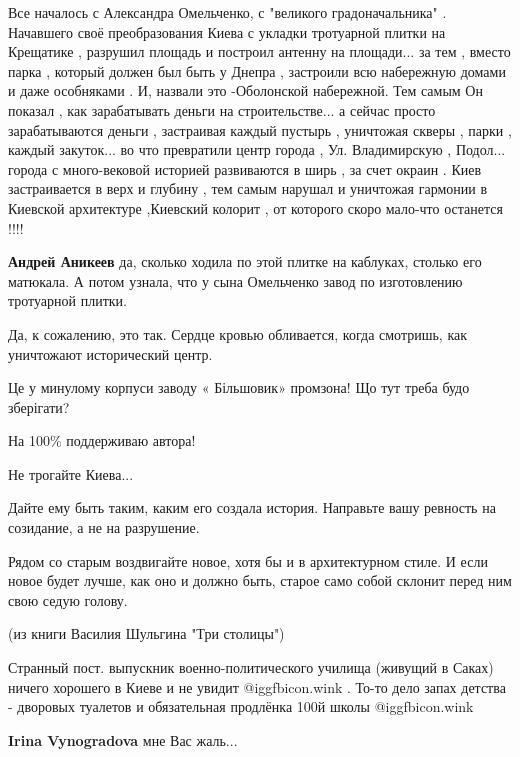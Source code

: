 \begin{itemize}

Все началось с Александра Омельченко, с "великого градоначальника" . Начавшего
своё преобразования Киева с укладки тротуарной плитки на Крещатике , разрушил
площадь и построил антенну на площади... за тем , вместо парка , который должен
был быть у Днепра , застроили всю набережную домами и даже особняками . И,
назвали это -Оболонской набережной. Тем самым Он показал , как зарабатывать
деньги на строительстве... а сейчас просто зарабатываются деньги , застраивая
каждый пустырь , уничтожая скверы , парки , каждый закуток... во что превратили
центр города , Ул. Владимирскую , Подол... города с много-вековой историей
развиваются в ширь , за счет окраин . Киев застраивается в верх и глубину , тем
самым нарушал и уничтожая гармонии в Киевской архитектуре ,Киевский колорит ,
от которого скоро мало-что останется !!!!

\begin{itemize} %
\textbf{Андрей Аникеев} да, сколько ходила по этой плитке на каблуках, столько его матюкала. А потом узнала, что у сына Омельченко завод по изготовлению тротуарной плитки.
\end{itemize} %

Да, к сожалению, это так. Сердце кровью обливается, когда смотришь, как уничтожают исторический центр.

Це у минулому корпуси заводу « Більшовик» промзона! Що тут треба будо зберігати?

На 100\% поддерживаю автора!


Не трогайте Киева...

Дайте ему быть таким, каким его создала история. Направьте вашу ревность на
созидание, а не на разрушение.

Рядом со старым воздвигайте новое, хотя бы и в архитектурном стиле. И если
новое будет лучше, как оно и должно быть, старое само собой склонит перед ним
свою седую голову.

(из книги Василия Шульгина "Три столицы")


Странный пост. выпускник военно-политического училища (живущий в Саках) ничего
хорошего в Киеве и не увидит @igg{fbicon.wink} . То-то дело запах детства - дворовых туалетов и
обязательная продлёнка 100й школы @igg{fbicon.wink} 

\begin{itemize} %
\textbf{Irina Vynogradova} мне Вас жаль...
\end{itemize} %


\end{itemize}
